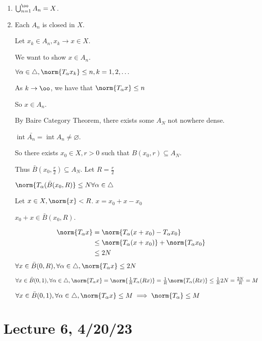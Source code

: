 \documentclass[x11names,reqno,14pt]{extarticle}
\newcommand{\seq}[2][\oo]{_{#2 = 1}^#1}
\newcommand{\bigcupn}[1][\oo]{\bigcup\seq[#1]{n}}
\DeclareMathOperator{\Int}{int}
\begin{document}
\begin{enumerate}

\item $\bigcupn A_n = X$. 

\item Each $A_n$ is closed in $X$. 

Let $x_k \in A_n, x_k \to x \in X$. 

We want to show $x \in A_n$. 

$\forall\alpha\in\bigtriangleup, \norm{T_\alpha x_k}\leq n, k = 1, 2, \dots$

As $k\to\oo$, we have that $\norm{T_\alpha x}\leq n$

So $x \in A_n$. 

By Baire Category Theorem, there exists some $A_N$ not nowhere dense. 

$\Int \bar{A_n} = \Int A_n \neq \varnothing$.

So there exists $x_0 \in X, r > 0$  such that $B(x_0, r) \subseteq A_N$. 

Thus $\bar{B}(x_0, \frac{r}{2}) \subseteq A_N$. Let $R = \frac{r}{2}$

$\norm{T_\alpha(\bar{B}(x_0, R)}\leq N\forall\alpha\in\bigtriangleup$

Let $x \in X, \norm{x}<R$. $x = x_0 + x - x_0$

$x_0 + x \in\bar{B}(x_0, R)$. 

\begin{align*}
\norm{T_\alpha x} & = \norm{T_\alpha(x + x_0) - T_\alpha x_0} \\
& \leq \norm{T_\alpha(x + x_0)} + \norm{T_\alpha x_0} \\
& \leq 2N
\end{align*}
$\forall x \in\bar{B}(0,R), \forall\alpha\in\bigtriangleup,\norm{T_\alpha x}\leq 2N$

$\forall x\in\bar{B}(0,1),\forall\alpha\in\bigtriangleup,\norm{T_\alpha x}= \norm{\frac{1}{R}T_\alpha (Rx)} = \frac{1}{R}\norm{T_\alpha(Rx)}\leq\frac{1}{R}2N = \frac{2N}{R} = M$

$\forall x\in\bar{B}(0,1),\forall\alpha\in\bigtriangleup,\norm{T_\alpha x}\leq M \implies \norm{T_\alpha}\leq M$






\end{enumerate}

\section*{Lecture 6, 4/20/23}
\end{document}
